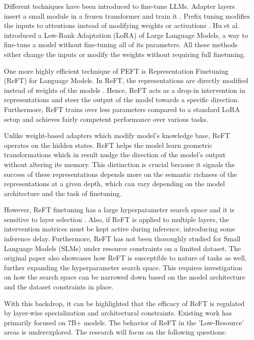 \documentclass[conference]{IEEEtran}
\begin{document}
	Different techniques have been introduced to fine-tune LLMs. Adapter layers insert a small module in a frozen transformer and train it \cite{houlsby2019parameter}. Prefix tuning modifies the inputs to attentions instead of modifying weights or activations \cite{li2021prefix}. Hu et al. \cite{hu2022lora} introduced a Low-Rank Adaptation (LoRA) of Large Language Models, a way to fine-tune a model without fine-tuning all of its parameters. All these methods either change the inputs or modify the weights without requiring full finetuning.
	
	One more highly efficient technique of PEFT is Representation Finetuning (ReFT) for Language Models. In ReFT, the representations are directly modified instead of weights of the models \cite{wu2024reft}. Hence, ReFT acts as a drop-in intervention in representations and steer the output of the model towards a specific direction. Furthermore, ReFT trains over less parameters compared to a standard LoRA setup and achieves fairly competent performance over various tasks.
	
	Unlike weight-based adapters which modify model's knowledge base, ReFT operates on the hidden states. ReFT helps the model learn geometric transformations which in result nudge the direction of the model's output without altering its memory. This distinction is crucial because it signals the success of these representations depends more on the semantic richness of the representations at a given depth, which can vary depending on the model architecture and the task of finetuning.
	
	However, ReFT finetuning has a large hyperparameter search space and it is sensitive to layer selection \cite{wu2024reft}. Also, if ReFT is applied to multiple layers, the intervention matrices must be kept active during inference, introducing some inference delay. Furthermore, ReFT has not been thoroughly studied for Small Language Models (SLMs) under resource constraints on a limited dataset. The original paper also showcases how ReFT is susceptible to nature of tasks as well, further expanding the hyperparameter search space. This requires investigation on how the search space can be narrowed down based on the model architecture and the dataset constraints in place.
	
	With this backdrop, it can be highlighted that the efficacy of ReFT is regulated by layer-wise specialization and architectural constraints. Existing work has primarily focused on 7B+ models. The behavior of ReFT in the 'Low-Resource' areas  is underexplored. The research will focus on the following questions:
	
\end{document}
